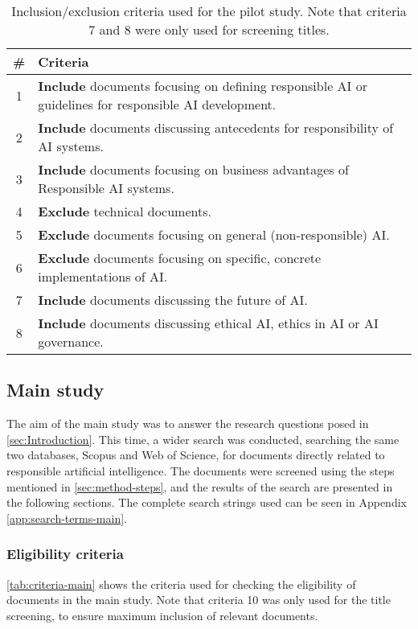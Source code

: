 \begin{table}[htp]
    \centering
    \begin{tabular}{cp{}}
        \textbf{\#} & \textbf{Criteria} \\
        \toprule
        1 & \textbf{Include} documents focusing on defining responsible AI or guidelines for responsible AI development. \\
        2 & \textbf{Include} documents discussing antecedents for responsibility of AI systems. \\
        3 & \textbf{Include} documents focusing on business advantages of Responsible AI systems. \\
        \midrule
        4 & \textbf{Exclude} technical documents. \\
        5 & \textbf{Exclude} documents focusing on general (non-responsible) AI. \\
        6 & \textbf{Exclude} documents focusing on specific, concrete implementations of AI. \\
        \midrule
        7 & \textbf{Include} documents discussing the future of AI. \\
        8 & \textbf{Include} documents discussing ethical AI, ethics in AI or AI governance. \\
    \end{tabular}
    \caption[Inclusion/exclusion criteria used for the pilot study]{Inclusion/exclusion criteria used for the pilot study. Note that criteria 7 and 8 were only used for screening titles.}
    \label{tab:criteria-pilot}
\end{table}


\subsection{Main study}
The aim of the main study was to answer the research questions posed in \autoref{sec:Introduction}. This time, a wider search was conducted, searching the same two databases, Scopus and Web of Science, for documents directly related to responsible artificial intelligence. The documents were screened using the steps mentioned in \autoref{sec:method-steps}, and the results of the search are presented in the following sections. The complete search strings used can be seen in Appendix \ref{app:search-terms-main}.


\subsubsection{Eligibility criteria}
\autoref{tab:criteria-main} shows the criteria used for checking the eligibility of documents in the main study. Note that criteria 10 was only used for the title screening, to ensure maximum inclusion of relevant documents.

